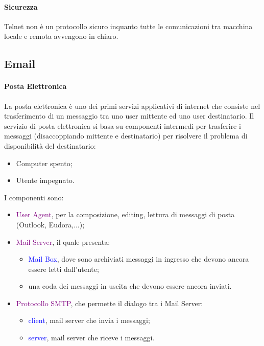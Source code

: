 \paragraph{Sicurezza} Telnet non è un protocollo sicuro inquanto tutte le comunicazioni tra macchina locale e remota avvengono in chiaro.

\subsection{Email}
\paragraph*{Posta Elettronica} La posta elettronica è uno dei primi servizi applicativi di internet che consiste nel trasferimento di un messaggio tra uno user mittente ed uno user destinatario.
Il servizio di posta elettronica si basa su componenti intermedi per trasferire i messaggi (disaccoppiando mittente e destinatario) per risolvere il problema di disponibilità del destinatario:
\begin{itemize}
    \item Computer spento;
    \item Utente impegnato.
\end{itemize}
I componenti sono:
\begin{itemize}
    \item \textcolor{purple}{User Agent}, per la composizione, editing, lettura di messaggi di posta (Outlook, Eudora,...);
    \item \textcolor{purple}{Mail Server}, il quale presenta:
        \begin{itemize}
            \item \textcolor{blue}{Mail Box}, dove sono archiviati messaggi in ingresso che devono ancora essere letti dall'utente;
            \item una coda dei messaggi in uscita che devono essere ancora inviati.
        \end{itemize}
    \item \textcolor{purple}{Protocollo SMTP}, che permette il dialogo tra i Mail Server:
        \begin{itemize}
            \item \textcolor{blue}{client}, mail server che invia i messaggi;
            \item \textcolor{blue}{server}, mail server che riceve i messaggi.
        \end{itemize}
\end{itemize}

